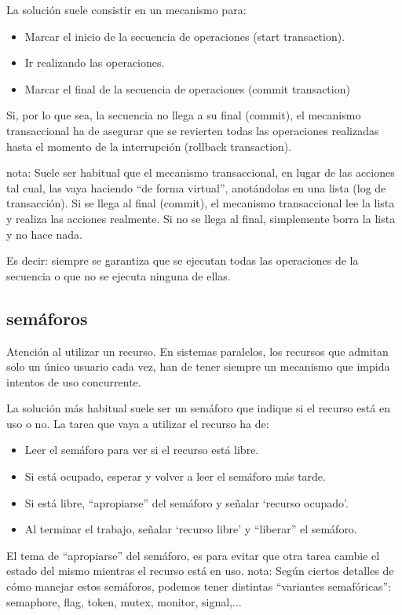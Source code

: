 \documentclass[spanish,12pt,a4paper,final,oneside]{book}
\begin{document}
La solución suele consistir en un mecanismo para:
\begin{itemize}
\item Marcar el inicio de la secuencia de operaciones (start transaction).
\item Ir realizando las operaciones.
\item Marcar el final de la secuencia de operaciones (commit transaction)
\end{itemize}

Si, por lo que sea, la secuencia no llega a su final (commit), el mecanismo transaccional ha de asegurar que se revierten todas las operaciones realizadas hasta el momento de la interrupción (rollback transaction).

nota: Suele ser habitual que el mecanismo transaccional, en lugar de las acciones tal cual, las vaya haciendo ``de forma virtual'', anotándolas en una lista (log de transacción). Si se llega al final (commit), el mecanismo transaccional lee la lista y realiza las acciones realmente. Si no se llega al final, simplemente borra la lista y no hace nada. 

Es decir: siempre se garantiza que se ejecutan todas las operaciones de la secuencia o que no se ejecuta ninguna de ellas.

\subsection{semáforos}
Atención al utilizar un recurso. En sistemas paralelos, los recursos que admitan solo un único usuario cada vez, han de tener siempre un mecanismo que impida intentos de uso concurrente.

La solución más habitual suele ser un semáforo  que indique si el recurso está en uso o no. La tarea que vaya a utilizar el recurso ha de:
\begin{itemize}
\item Leer el semáforo para ver si el recurso está libre.
\item Si está ocupado, esperar y volver a leer el semáforo más tarde.
\item Si está libre, ``apropiarse'' del semáforo y señalar `recurso ocupado'.
\item Al terminar el trabajo, señalar `recurso libre' y ``liberar'' el semáforo.
\end{itemize}

El tema de ``apropiarse'' del semáforo, es para evitar que otra tarea cambie el estado del mismo mientras el recurso está en uso.
nota: Según ciertos detalles de cómo manejar estos semáforos, podemos tener distintas ``variantes semafóricas'': semaphore, flag, token, mutex, monitor, signal,...
\end{document}
